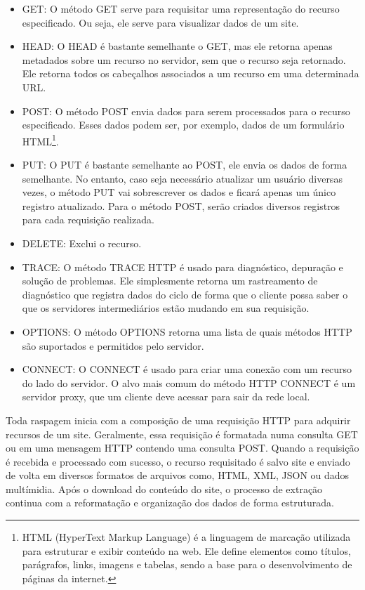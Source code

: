\documentclass[
  12pt,
  a4paper,
]{scrreprt}
\begin{document}
\begin{itemize}
\item
  GET: O método GET serve para requisitar uma representação do recurso
  especificado. Ou seja, ele serve para visualizar dados de um site.
\item
  HEAD: O HEAD é bastante semelhante o GET, mas ele retorna apenas
  metadados sobre um recurso no servidor, sem que o recurso seja
  retornado. Ele retorna todos os cabeçalhos associados a um recurso em
  uma determinada URL.
\item
  POST: O método POST envia dados para serem processados para o recurso
  especificado. Esses dados podem ser, por exemplo, dados de um
  formulário HTML\footnote{HTML (HyperText Markup Language) é a
    linguagem de marcação utilizada para estruturar e exibir conteúdo na
    web. Ele define elementos como títulos, parágrafos, links, imagens e
    tabelas, sendo a base para o desenvolvimento de páginas da internet.}.
\item
  PUT: O PUT é bastante semelhante ao POST, ele envia os dados de forma
  semelhante. No entanto, caso seja necessário atualizar um usuário
  diversas vezes, o método PUT vai sobrescrever os dados e ficará apenas
  um único registro atualizado. Para o método POST, serão criados
  diversos registros para cada requisição realizada.
\item
  DELETE: Exclui o recurso.
\item
  TRACE: O método TRACE HTTP é usado para diagnóstico, depuração e
  solução de problemas. Ele simplesmente retorna um rastreamento de
  diagnóstico que registra dados do ciclo de forma que o cliente possa
  saber o que os servidores intermediários estão mudando em sua
  requisição.
\item
  OPTIONS: O método OPTIONS retorna uma lista de quais métodos HTTP são
  suportados e permitidos pelo servidor.
\item
  CONNECT: O CONNECT é usado para criar uma conexão com um recurso do
  lado do servidor. O alvo mais comum do método HTTP CONNECT é um
  servidor proxy, que um cliente deve acessar para sair da rede local.
\end{itemize}

Toda raspagem inicia com a composição de uma requisição HTTP para
adquirir recursos de um site. Geralmente, essa requisição é formatada
numa consulta GET ou em uma mensagem HTTP contendo uma consulta POST.
Quando a requisição é recebida e processado com sucesso, o recurso
requisitado é salvo site e enviado de volta em diversos formatos de
arquivos como, HTML, XML, JSON ou dados multímidia. Após o download do
conteúdo do site, o processo de extração continua com a reformatação e
organização dos dados de forma estruturada.
\end{document}
